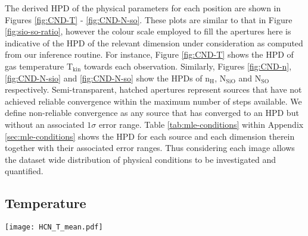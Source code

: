 \documentclass[twocolumn]{aastex631}
\begin{document}
The derived HPD of the physical parameters for each position are shown in Figures \ref{fig:CND-T} - \ref{fig:CND-N-so}. These plots are similar to that in Figure \ref{fig:sio-so-ratio}, however the colour scale employed to fill the apertures here is indicative of the HPD of the relevant dimension under consideration as computed from our inference routine. For instance, Figure \ref{fig:CND-T} shows the HPD of gas temperature T$_{\mathrm{kin}}$ towards each observation. Similarly, Figures \ref{fig:CND-n}, \ref{fig:CND-N-sio} and \ref{fig:CND-N-so} show the HPDs of n$_{\mathrm{H}}$, N$_{\mathrm{SiO}}$ and N$_{\mathrm{SO}}$ respectively. Semi-transparent, hatched apertures represent sources that have not achieved reliable convergence within the maximum number of steps available. We define non-reliable convergence as any source that has converged to an HPD but without an associated $1\sigma$ error range. Table \ref{tab:mle-conditions} within Appendix \ref{sec:mle-conditions} shows the HPD for each source and each dimension therein together with their associated error ranges. Thus considering each image allows the dataset wide distribution of physical conditions to be investigated and quantified.

\subsection{Temperature} \label{sec:CND-gas-cond-T}

\begin{figure*}
    \centering
    \texttt{[image: HCN\_T\_mean.pdf]}
    \caption{The points of highest posterior density (HPD) of the kinetic gas temperature T$_{\mathrm{HPD}}$ towards each position outlined in Section \ref{sec:obs}. Semi-transparent, hatched circular regions indicate a position whose chain has not reliably converged. G2 (in Panel 1) is noticeably warmer than its surroundings, which are much lower in their recovered temperatures. Panels 2 and 3 show more agreement between neighbouring positions.}
    \label{fig:CND-T}
\end{figure*}
\end{document}
